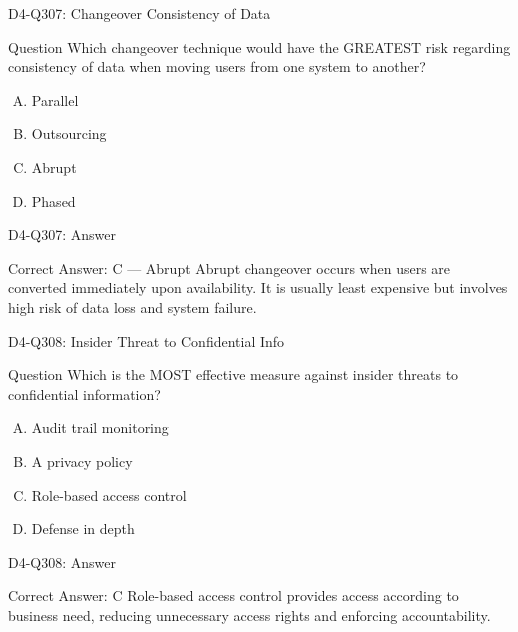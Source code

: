 \documentclass{beamer}
\begin{document}
	\begin{frame}{D4-Q307: Changeover Consistency of Data}
		\begin{block}{Question}
			Which changeover technique would have the GREATEST risk regarding consistency of data when moving users from one system to another?
		\end{block}
		\begin{enumerate}[(A)]
			\item Parallel
			\item Outsourcing
			\item Abrupt
			\item Phased
		\end{enumerate}
	\end{frame}
	\begin{frame}{D4-Q307: Answer}
		\begin{block}{Correct Answer: C --- Abrupt}
			Abrupt changeover occurs when users are converted immediately upon availability. It is usually least expensive but involves high risk of data loss and system failure.
		\end{block}
	\end{frame}
	
	\begin{frame}{D4-Q308: Insider Threat to Confidential Info}
		\begin{block}{Question}
			Which is the MOST effective measure against insider threats to confidential information?
		\end{block}
		\begin{enumerate}[(A)]
			\item Audit trail monitoring
			\item A privacy policy
			\item Role-based access control
			\item Defense in depth
		\end{enumerate}
	\end{frame}
	\begin{frame}{D4-Q308: Answer}
		\begin{block}{Correct Answer: C}
			Role-based access control provides access according to business need, reducing unnecessary access rights and enforcing accountability.
		\end{block}
	\end{frame}
	
\end{document}
